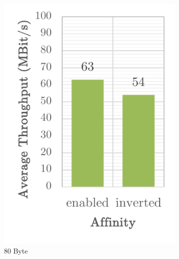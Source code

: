 \begin{figure}[h]
    \centering
    \begin{subfigure}[b]{0.32\textwidth}
        \centering
        \includegraphics[width=\textwidth]{figures/reliability/ihawk/diagr10a.pdf}
        \caption{80 Byte}
    \end{subfigure}
    \hfill
    \begin{subfigure}[b]{0.32\textwidth}
        \centering

\end{subfigure}
\end{figure}
